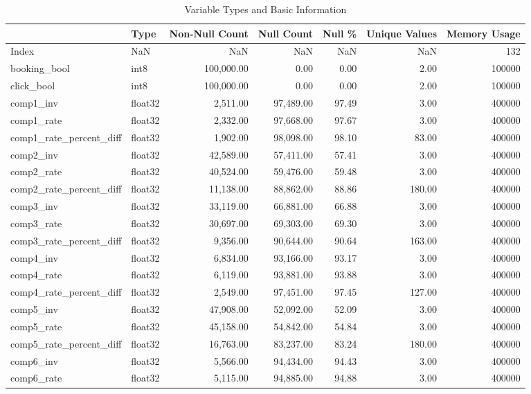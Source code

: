 \begin{table}
\caption{Variable Types and Basic Information}
\label{tab:data_types}
\begin{tabular}{llrrrrr}
\toprule
 & Type & Non-Null Count & Null Count & Null \% & Unique Values & Memory Usage \\
\midrule
Index & NaN & NaN & NaN & NaN & NaN & 132 \\
booking\_bool & int8 & 100,000.00 & 0.00 & 0.00 & 2.00 & 100000 \\
click\_bool & int8 & 100,000.00 & 0.00 & 0.00 & 2.00 & 100000 \\
comp1\_inv & float32 & 2,511.00 & 97,489.00 & 97.49 & 3.00 & 400000 \\
comp1\_rate & float32 & 2,332.00 & 97,668.00 & 97.67 & 3.00 & 400000 \\
comp1\_rate\_percent\_diff & float32 & 1,902.00 & 98,098.00 & 98.10 & 83.00 & 400000 \\
comp2\_inv & float32 & 42,589.00 & 57,411.00 & 57.41 & 3.00 & 400000 \\
comp2\_rate & float32 & 40,524.00 & 59,476.00 & 59.48 & 3.00 & 400000 \\
comp2\_rate\_percent\_diff & float32 & 11,138.00 & 88,862.00 & 88.86 & 180.00 & 400000 \\
comp3\_inv & float32 & 33,119.00 & 66,881.00 & 66.88 & 3.00 & 400000 \\
comp3\_rate & float32 & 30,697.00 & 69,303.00 & 69.30 & 3.00 & 400000 \\
comp3\_rate\_percent\_diff & float32 & 9,356.00 & 90,644.00 & 90.64 & 163.00 & 400000 \\
comp4\_inv & float32 & 6,834.00 & 93,166.00 & 93.17 & 3.00 & 400000 \\
comp4\_rate & float32 & 6,119.00 & 93,881.00 & 93.88 & 3.00 & 400000 \\
comp4\_rate\_percent\_diff & float32 & 2,549.00 & 97,451.00 & 97.45 & 127.00 & 400000 \\
comp5\_inv & float32 & 47,908.00 & 52,092.00 & 52.09 & 3.00 & 400000 \\
comp5\_rate & float32 & 45,158.00 & 54,842.00 & 54.84 & 3.00 & 400000 \\
comp5\_rate\_percent\_diff & float32 & 16,763.00 & 83,237.00 & 83.24 & 180.00 & 400000 \\
comp6\_inv & float32 & 5,566.00 & 94,434.00 & 94.43 & 3.00 & 400000 \\
comp6\_rate & float32 & 5,115.00 & 94,885.00 & 94.88 & 3.00 & 400000 \\

\end{tabular}
\end{table}
